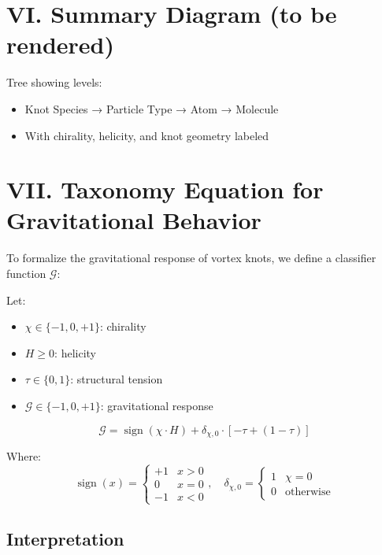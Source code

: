 \documentclass[12pt]{article}
\begin{document}
\section*{VI. Summary Diagram (to be rendered)}
Tree showing levels:
\begin{itemize}
    \item Knot Species → Particle Type → Atom → Molecule
    \item With chirality, helicity, and knot geometry labeled
\end{itemize}

\section*{VII. Taxonomy Equation for Gravitational Behavior}

To formalize the gravitational response of vortex knots, we define a classifier function \( \mathcal{G} \):

Let:
\begin{itemize}
    \item \( \chi \in \{-1, 0, +1\} \): chirality
    \item \( H \geq 0 \): helicity
    \item \( \tau \in \{0,1\} \): structural tension
    \item \( \mathcal{G} \in \{-1, 0, +1\} \): gravitational response
\end{itemize}

\[
\boxed{\mathcal{G} = \operatorname{sign}(\chi \cdot H) + \delta_{\chi, 0} \cdot \left[ -\tau + (1 - \tau) \right]}
\]

Where:
\[ \operatorname{sign}(x) = \begin{cases}  +1 & x > 0 \\
                                            0 & x = 0 \\
                                           -1 & x < 0
                            \end{cases}, \quad \delta_{\chi,0} = \begin{cases} 1 & \chi = 0 \\
                                                                               0 & \text{otherwise}
                                                                 \end{cases}
\]

\subsection*{Interpretation}
\end{document}
